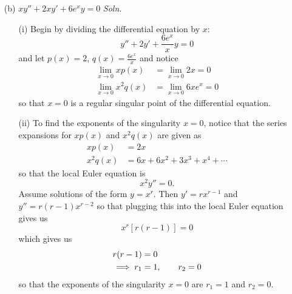\documentclass{article}
\begin{document}
\begin{itemize}
\begin{itemize}
        \item[(b)] $xy'' + 2xy' + 6e^xy = 0$
        \newline\newline
        \textit{Soln.}
        \begin{itemize}
            \item[(i)] Begin by dividing the differential equation by $x$:
            \[y'' + 2y' + \frac{6e^x}{x}y = 0\]
            and let $p(x) = 2$, $q(x) = \frac{6e^x}{x}$ and notice
            \begin{align*}
                \lim_{x \to 0} xp(x) &= \lim_{x \to 0}2x = 0\\
                \lim_{x \to 0} x^2q(x) &= \lim_{x \to 0} 6xe^x = 0
            \end{align*}
            so that $x = 0$ is a regular singular point of the differential equation.

            \item[(ii)] To find the exponents of the singularity $x = 0$, notice that the series expansions for $xp(x)$ and $x^2q(x)$ are given as
            \begin{align*}
                xp(x) &= 2x\\
                x^2q(x) &= 6x + 6x^2 + 3x^3 + x^4 + \cdots
            \end{align*}
            so that the local Euler equation is 
            \[x^2y'' = 0.\]
            Assume solutions of the form $y = x^r$. Then $y' = rx^{r-1}$ and $y'' = r(r-1)x^{r-2}$ so that plugging this into the local Euler equation gives us
            \[x^r[r(r-1)] = 0\]
            which gives us
            \begin{align*}
                r(r-1) &= 0\\
                \implies r_1 &= 1, \hspace{0.7cm} r_2 = 0
            \end{align*}
            so that the exponents of the singularity $x = 0$ are $r_1 = 1$ and $r_2 = 0$.
            \newline\newline


\end{itemize}
\end{itemize}
\end{itemize}
\end{document}
